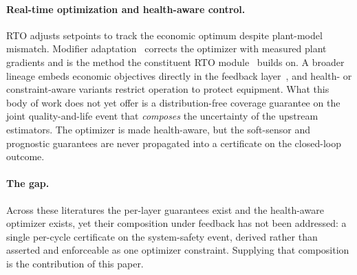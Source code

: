 \paragraph{Real-time optimization and health-aware control.}
RTO adjusts setpoints to track the economic optimum despite plant-model mismatch.
Modifier adaptation~\citep{marchetti2009,chachuat2009} corrects the optimizer with
measured plant gradients and is the method the constituent RTO
module~\citep{busico_m3} builds on. A broader lineage embeds economic objectives
directly in the feedback layer~\citep{skogestad2000}, and health- or constraint-aware
variants restrict operation to protect equipment. What this body of work does not yet
offer is a distribution-free coverage guarantee on the joint quality-and-life event that
\emph{composes} the uncertainty of the upstream estimators. The optimizer is made
health-aware, but the soft-sensor and prognostic guarantees are never propagated into a
certificate on the closed-loop outcome.

\paragraph{The gap.}
Across these literatures the per-layer guarantees exist and the health-aware optimizer
exists, yet their composition under feedback has not been addressed: a single per-cycle
certificate on the system-safety event, derived rather than asserted and enforceable as
one optimizer constraint. Supplying that composition is the contribution of this paper.
